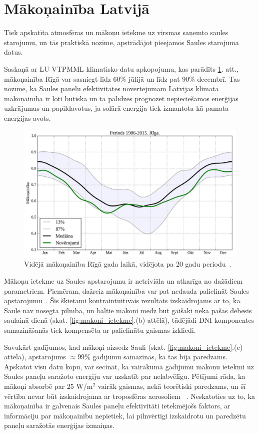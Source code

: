 \section{Mākoņainība Latvijā}

Tiek apskatīta atmosfēras un mākoņu ietekme uz virsmas saņemto saules starojumu, un tās praktiskā nozīme, apstrādājot pieejamos Saules starojuma datus.

Saskaņā ar LU VTPMML klimatisko datu apkopojumu, kas parādīts \ref{fig:makoni_Riga}. att., mākoņainība Rīgā var sasniegt līdz 60\% jūlijā un līdz pat 90\% decembrī. Tas nozīmē, ka Saules paneļu efektivitātes novērtējumam Latvijas klimatā mākoņainība ir ļoti būtiska un tā palīdzēs prognozēt nepieciešamos enerģijas uzkrājumus un papildavotus, ja solārā enerģija tiek izmantota kā pamata enerģijas avots.
\begin{figure}[h]
	\centering
	\includegraphics[width=0.8\linewidth]{figures/misc/makoni_riga.jpg}
	\caption{Vidējā mākoņainība Rīgā gada laikā, vidējota pa 20 gadu periodu~\cite{cloudsModlab}.}
	\label{fig:makoni_Riga}
\end{figure}

Mākoņu ietekme uz Saules apstarojumu ir netriviāla un atkarīga no dažādiem parametriem. Piemēram, dažreiz mākoņainība var pat nedaudz palielināt Saules apstarojumu~\cite{CloudCoverageImpactOnIrradiance}. Šis šķietami kontraintuitīvais rezultāts izskaidrojams ar to, ka Saule nav nosegta pilnībā, un baltie mākoņi mēdz būt gaišāki nekā pašas debesis saulainā dienā (skat. \ref{fig:makoni_ietekme}.(b) attēlā), tādējādi DNI komponentes samazināšanās tiek kompensēta ar palielinātu gaismas izkliedi. 

Savukārt gadījumos, kad mākoņi aizsedz Sauli (skat. \ref{fig:makoni_ietekme}.(c) attēlā), apstarojums $\approx99\%$ gadījumu samazinās, kā tas bija paredzams.
Apskatot visu datu kopu, var secināt, ka vairākumā gadījumu mākoņu ietekmi uz Saules paneļu saražoto enerģiju var uzskatīt par nelabvēlīgu.
Pētījumi rāda, ka mākoņi absorbē par 25 W/m$^2$ vairāk gaismas, nekā teorētiski paredzams, un šī vērtība nevar būt izskaidrojama ar troposfēras aerosoliem ~\cite{observVSModel}. Neskatoties uz to, ka mākoņainība ir galvenais Saules paneļu efektivitāti ietekmējošs faktors, ar informāciju par mākoņainību nepietiek, lai pilnvērtīgi izskaidrotu un paredzētu paneļu saražotās enerģijas izmaiņas.

